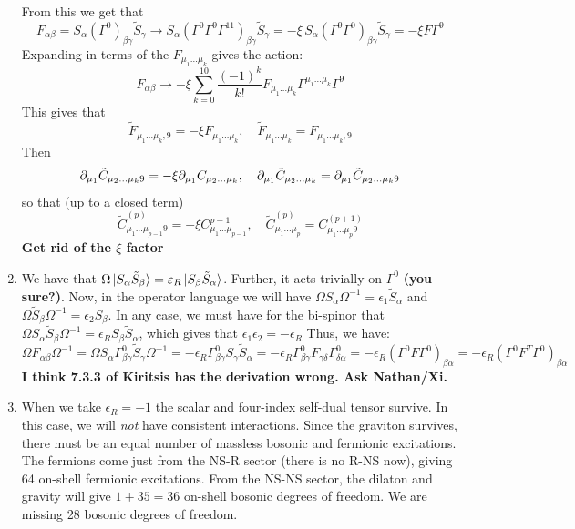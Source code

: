 \documentclass[11pt, class=article, crop=false]{standalone}
\begin{document}
\begin{enumerate}
	From this we get that 
	\[
		F_{\alpha \beta} = S_{\alpha} (\Gamma^{0})_{\beta \gamma} \tilde S_\gamma \to S_{\alpha} (\Gamma^{0} \Gamma^{9} \Gamma^{11})_{\beta \gamma} \tilde S_\gamma = - \xi \, S_{\alpha} (\Gamma^{9} \Gamma^{0})_{\beta \gamma} \tilde S_\gamma = - \xi F \Gamma^{9}
	\]
	Expanding in terms of the $F_{\mu_1 \dots \mu_k}$ gives the action:
	\[
		F_{\alpha \beta} \to - \xi \sum_{k=0}^{10} \frac{(-1)^k}{k!} F_{\mu_1 \dots \mu_k} \Gamma^{\mu_1 \dots \mu_k} \Gamma^{9}
	\]
	This gives that
	\[
		\tilde F_{\mu_1 \dots \mu_k, 9} = - \xi F_{\mu_1 \dots \mu_k}, \quad \tilde F_{\mu_1 \dots \mu_k} = F_{\mu_1 \dots \mu_k, 9}
	\]
	Then
	\[
		\partial_{\mu_1} \tilde C_{\mu_2 \dots \mu_k 9} = -\xi \partial_{\mu_1} C_{\mu_2 \dots \mu_k}, \quad \partial_{\mu_1} \tilde C_{\mu_2 \dots \mu_k} = \partial_{\mu_1} \tilde C_{\mu_2 \dots \mu_k 9}
	\]
	so that (up to a closed term)
	\[
		\tilde C_{\mu_1 \dots \mu_{p-1} 9}^{(p)} = -\xi C_{\mu_1 \dots \mu_{p-1}}^{p-1}, \quad \tilde C^{(p)}_{\mu_1 \dots \mu_p} = C^{(p+1)}_{\mu_1 \dots \mu_p 9}
	\]
	\textbf{Get rid of the $\xi$ factor}
	
	\item We have that $\Omega \ket{S_\alpha \tilde S_\beta} = \varepsilon_R \ket{S_\beta \tilde S_\alpha}$. Further, it acts trivially on $\Gamma^0$ \textbf{(you sure?)}. Now, in the operator language we will have $\Omega S_\alpha \Omega^{-1} = \epsilon_1 \tilde S_\alpha$ and $\Omega \tilde S_\beta \Omega^{-1} = \epsilon_2 S_\beta$. In any case, we must have for the bi-spinor that $\Omega S_\alpha \tilde S_\beta \Omega^{-1} = \epsilon_R S_\beta \tilde S_\alpha$, which gives that $\epsilon_1 \epsilon_2 = -\epsilon_R$ Thus, we have:
	\[
		\Omega F_{\alpha \beta} \Omega^{-1} = \Omega S_\alpha \Gamma^0_{\beta \gamma} \tilde S_\gamma \Omega^{-1} = - \epsilon_R \Gamma^0_{\beta \gamma} S_{\gamma} \tilde S_\alpha = - \epsilon_R \Gamma^0_{\beta \gamma} F_{\gamma \delta} \Gamma^0_{\delta \alpha} = -\epsilon_R (\Gamma^0 F \Gamma^0)_{\beta \alpha} =  -\epsilon_R (\Gamma^0 F^T \Gamma^0)_{\beta \alpha }
	\]
	\textbf{I think 7.3.3 of Kiritsis has the derivation wrong. Ask Nathan/Xi.}
	\item When we take $\epsilon_R = -1$ the scalar and four-index self-dual tensor survive. In this case, we will \emph{not} have consistent interactions. Since the graviton survives, there must be an equal number of massless bosonic and fermionic excitations. The fermions come just from the NS-R sector (there is no R-NS now), giving 64 on-shell fermionic excitations. From the NS-NS sector, the dilaton and gravity will give $1+35 = 36$ on-shell bosonic degrees of freedom. We are missing 28 bosonic degrees of freedom. 
	

\end{enumerate}
\end{document}
